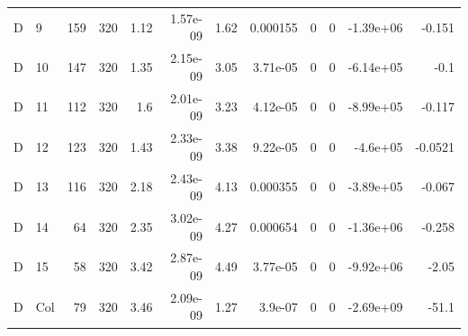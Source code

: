 \begin{tabular}{llrrrrrrrrrr}
D & 9 & 159 & 320 & 1.12 & 1.57e-09 & 1.62 & 0.000155 & 0 & 0 & -1.39e+06 & -0.151 \\
D & 10 & 147 & 320 & 1.35 & 2.15e-09 & 3.05 & 3.71e-05 & 0 & 0 & -6.14e+05 & -0.1 \\
D & 11 & 112 & 320 & 1.6 & 2.01e-09 & 3.23 & 4.12e-05 & 0 & 0 & -8.99e+05 & -0.117 \\
D & 12 & 123 & 320 & 1.43 & 2.33e-09 & 3.38 & 9.22e-05 & 0 & 0 & -4.6e+05 & -0.0521 \\
D & 13 & 116 & 320 & 2.18 & 2.43e-09 & 4.13 & 0.000355 & 0 & 0 & -3.89e+05 & -0.067 \\
D & 14 & 64 & 320 & 2.35 & 3.02e-09 & 4.27 & 0.000654 & 0 & 0 & -1.36e+06 & -0.258 \\
D & 15 & 58 & 320 & 3.42 & 2.87e-09 & 4.49 & 3.77e-05 & 0 & 0 & -9.92e+06 & -2.05 \\
D & Col & 79 & 320 & 3.46 & 2.09e-09 & 1.27 & 3.9e-07 & 0 & 0 & -2.69e+09 & -51.1 \\
\bottomrule
\end{tabular}
